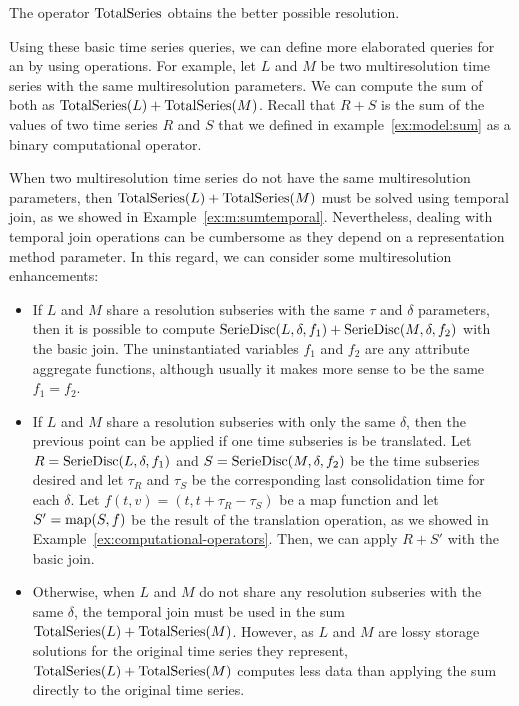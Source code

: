 The operator $\operatorname{TotalSeries}$ obtains the better possible resolution.

Using these basic time series queries, we can define more elaborated
queries for an  by using  operations. For
example, let $L$ and $M$ be two multiresolution time series with the
same multiresolution parameters. We can compute the sum of both as
$\operatorname{TotalSeries}(L) + \operatorname{TotalSeries}(M)$. Recall that $R+S$ is the sum of
the values of two time series $R$ and $S$ that we defined in
example~\ref{ex:model:sum} as a binary computational operator.


When two multiresolution time series do not have the same
multiresolution parameters, then $\operatorname{TotalSeries}(L) + \operatorname{TotalSeries}(M)$
must be solved using temporal join, as we showed in
Example~\ref{ex:m:sumtemporal}. Nevertheless, dealing with
temporal join operations can be cumbersome as they depend on a
representation method parameter. In this regard, we can consider some
multiresolution enhancements:

\begin{itemize}

\item If $L$ and $M$ share a resolution subseries with the same
  $\tau$ and $\delta$ parameters, then it is possible to compute
  $\operatorname{SerieDisc}(L,\delta,f_1) + \operatorname{SerieDisc}(M,\delta,f_2)$ with the basic
  join. The uninstantiated variables $f_1$ and $f_2$ are any attribute
  aggregate functions, although usually it makes more sense to be the
  same $f_1=f_2$.

\item If $L$ and $M$ share a resolution subseries with only the same
  $\delta$, then the previous point can be applied if one time
  subseries is be translated. Let $R=\operatorname{SerieDisc}(L,\delta,f_1)$ and
  $S=\operatorname{SerieDisc}(M,\delta,f_2)$ be the time subseries desired and let
  $\tau_R$ and $\tau_S$ be the corresponding last consolidation time
  for each $\delta$. Let $f(t,v)=(t,t+\tau_R-\tau_S)$ be a map
  function and let $S'=\operatorname*{map}(S,f)$ be the result of the translation
  operation, as we showed in Example~\ref{ex:computational-operators}.
  Then, we can apply $R+S'$ with the basic join.
  
\item Otherwise, when $L$ and $M$ do not share any resolution
  subseries with the same $\delta$, the temporal join must be used in
  the sum $\operatorname{TotalSeries}(L) + \operatorname{TotalSeries}(M)$.  However, as $L$ and
  $M$ are lossy storage solutions for the original time series they
  represent, $\operatorname{TotalSeries}(L) + \operatorname{TotalSeries}(M)$ computes less data
  than applying the sum directly to the original time series.

\end{itemize}




